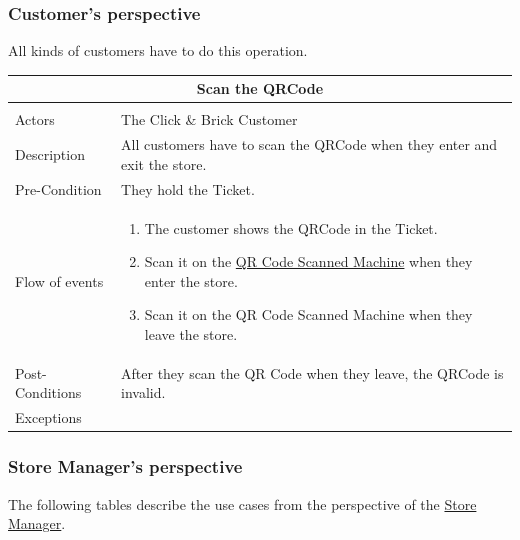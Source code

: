 \documentclass[a4paper,12pt]{report}
\begin{document}
\subsubsection{Customer's perspective}
All kinds of customers have to do this operation.
\begin{center}
	\begin{tabular}{p{}|p{}}
		\multicolumn{2}{c}{\large \textbf{Scan the QRCode}} \\[3mm] 
		\hline \\
		Actors &   The Click  \& Brick Customer \\[3mm] 
		Description & All customers have to scan the QRCode when they enter and exit the store.\\[3mm]  
		Pre-Condition &  They hold the Ticket.\\[3mm] 
		Flow of events & 
		\begin{enumerate}
			\item The customer shows the QRCode in the Ticket.
			\item Scan it on the \hyperref[Definitions]{QR Code Scanned Machine} when they enter the store.
			\item Scan it on the QR Code Scanned Machine when they leave the store.
		\end{enumerate}
		\\[3mm] 
		Post-Conditions & After they scan the QR Code when they leave, the QRCode is invalid. \\[3mm] 
		Exceptions & \\[3mm] 
	\end{tabular}
\end{center}



\subsubsection{Store Manager’s perspective}
The following tables describe the use cases from the perspective of the \hyperref[Definitions]{Store Manager}.
\end{document}
